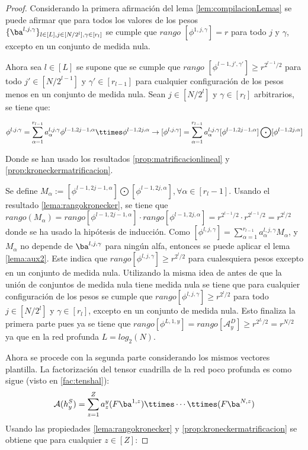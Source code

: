 \begin{proof}
Considerando la primera afirmación del lema \ref{lem:compilacionLemas} se puede afirmar que para todos los valores de los pesos \\ $\{\ba^{l,j,\gamma}\}_{l \in [L], j\in [N/2^l],\gamma \in [r_l]}$ se cumple que  $\textit{rango }[\phi^{1,j,\gamma}] = r$ para todo $j$ y $\gamma$, excepto en un conjunto de medida nula.

Ahora sea $l\in[L]$ se supone que se cumple que $\textit{rango }[\phi^{l-1,j',\gamma'}] \geq r^{2^{l-1}/2}$ para todo $j'\in[N/2^{l-1}]$ y $\gamma' \in [r_{l-1}]$ para cualquier configuración de los pesos menos en un conjunto de medida nula. Sean $j\in[N/2^l]$ y $\gamma \in [r_l]$ arbitrarios, se tiene que:

$$
\phi^{l,j,\gamma} = \sum_{\alpha = 1}^{r_{l-1}} a^{l,j,\gamma}_\alpha \phi^{l-1,2j-1,\alpha} \ttimes \phi^{l-1,2j,\alpha} \rightarrow [\phi^{l,j,\gamma}] = \sum_{\alpha = 1}^{r_{l-1}} a^{l,j,\gamma}_\alpha [\phi^{l-1,2j-1,\alpha}] \bigodot [\phi^{l-1,2j,\alpha}]
$$

Donde se han usado los resultados \ref{prop:matrificacionlineal} y \ref{prop:kroneckermatrificacion}.

Se define $M_\alpha := [\phi^{l-1,2j-1,\alpha}] \bigodot [\phi^{l-1,2j,\alpha}], \forall \alpha \in [r_l-1]$. Usando el resultado \ref{lema:rangokronecker}, se tiene que $\textit{rango}(M_\alpha) = \textit{rango}[\phi^{l-1,2j-1,\alpha}] \cdot \textit{rango}[\phi^{l-1,2j,\alpha}] = r^{2^{l-1}/2} \cdot r^{2^{l-1}/2} = r^{2^l/2}$ donde se ha usado la hipótesis de inducción. Como $ [\phi^{l,j,\gamma}] = \sum_{\alpha = 1}^{r_{l-1}} a^{l,j,\gamma}_\alpha M_\alpha$, y $M_\alpha$ no depende de $\ba^{l,j,\gamma}$ para ningún alfa, entonces se puede aplicar el lema \ref{lema:aux2}. Este indica que $\textit{rango}[\phi^{l,j,\gamma}] \geq r^{2^l/2}$ para cualesquiera pesos excepto en un conjunto de medida nula. Utilizando la misma idea de antes de que la unión de conjuntos de medida nula tiene medida nula se tiene que para cualquier configuración de los pesos se cumple que $\textit{rango}[\phi^{l,j,\gamma}] \geq r^{2^l/2}$ para todo $j\in[N/2^l]$ y $\gamma\in[r_l]$, excepto en un conjunto de medida nula. Esto finaliza la primera parte pues ya se tiene que $\textit{rango}[\phi^{L,1,y}] = \textit{rango}[\mathcal{A}^D_y] \geq r^{2^L/2} = r^{N/2}$ ya que en la red profunda $L = log_2(N)$.

Ahora se procede con la segunda parte considerando los mismos vectores plantilla. La factorización del tensor cuadrilla de la red poco profunda es como sigue (visto en \ref{fac:tenshal}):
$$
\mathcal{A}(h_y^S)=\sum_{z=1}^{Z}a^y_z(F\ba^{1,z})\ttimes\cdots \ttimes(F\ba^{N,z})
$$
Usando las propiedades \ref{lema:rangokronecker} y \ref{prop:kroneckermatrificacion} se obtiene que para cualquier $z\in [Z]$:


\end{proof}
